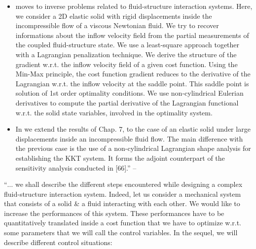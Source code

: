 \documentclass[oneside]{book}
\numberwithin{equation}{section}
\begin{document}
\begin{itemize}
	\item \cite[Chap. 7]{Moubachir_Zolesio2006} moves to inverse problems related to fluid-structure interaction systems. Here, we consider a 2D elastic solid with rigid displacements inside the incompressible flow of a viscous Newtonian fluid. We try to recover informations about the inflow velocity field from the partial measurements of the coupled fluid-structure state. We use a least-square approach together with a Lagrangian penalization technique. We derive the structure of the gradient w.r.t. the inflow velocity field of a given cost function. Using the Min-Max principle, the cost function gradient reduces to the derivative of the Lagrangian w.r.t. the inflow velocity at the saddle point. This saddle point is solution of 1st order optimality conditions. We use non-cylindrical Eulerian derivatives to compute the partial derivative of the Lagrangian functional w.r.t. the solid state variables, involved in the optimality system.
	\item In \cite[Chap. 8]{Moubachir_Zolesio2006} we extend the results of Chap. 7, to the case of an elastic solid under large displacements inside an incompressible fluid flow. The main difference with the previous case is the use of a non-cylindrical Lagrangian shape analysis for establishing the KKT system. It forms the adjoint counterpart of the sensitivity analysis conducted in [66].'' -- \cite[Chap. 1, Sect. 1.3, pp. 6--7]{Moubachir_Zolesio2006}
\end{itemize}
``$\ldots$ we shall describe the different steps encountered while designing a complex fluid-structure interaction system. Indeed, let us consider a mechanical system that consists of a solid \& a fluid interacting with each other. We would like to increase the performances of this system. These performances have to be quantitatively translated inside a cost function that we have to optimize w.r.t. some parameters that we will call the control variables. In the sequel, we will describe different control situations:
\end{document}
